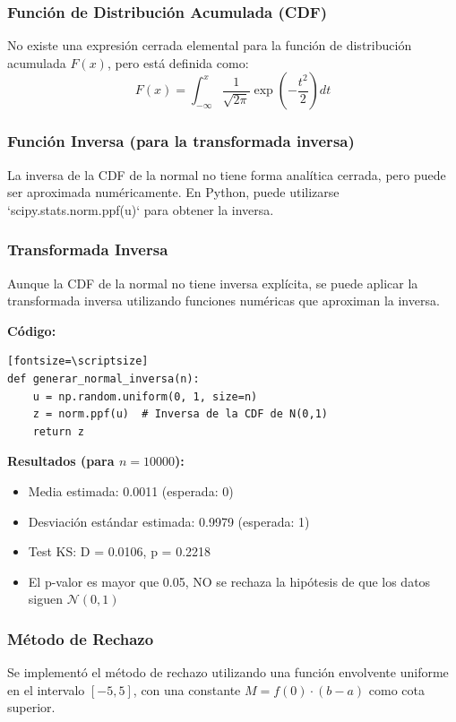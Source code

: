 \documentclass{article}
\begin{document}
\subsubsection*{Función de Distribución Acumulada (CDF)}
No existe una expresión cerrada elemental para la función de distribución acumulada \(F(x)\), pero está definida como:
\[
F(x) = \int_{-\infty}^{x} \frac{1}{\sqrt{2\pi}} \exp\left(-\frac{t^2}{2}\right) dt
\]

\subsubsection*{Función Inversa (para la transformada inversa)}
La inversa de la CDF de la normal no tiene forma analítica cerrada, pero puede ser aproximada numéricamente. En Python, puede utilizarse `scipy.stats.norm.ppf(u)` para obtener la inversa.

\subsubsection{Transformada Inversa}
Aunque la CDF de la normal no tiene inversa explícita, se puede aplicar la transformada inversa utilizando funciones numéricas que aproximan la inversa.

\textbf{Código:}
\begin{verbatim}[fontsize=\scriptsize]
def generar_normal_inversa(n):
    u = np.random.uniform(0, 1, size=n)
    z = norm.ppf(u)  # Inversa de la CDF de N(0,1)
    return z
\end{verbatim}

\textbf{Resultados (para $n=10000$):}
\begin{itemize}
    \item Media estimada: 0.0011 (esperada: 0)
    \item Desviación estándar estimada: 0.9979 (esperada: 1)
    \item Test KS: D = 0.0106, p = 0.2218
    \item El p-valor es mayor que 0.05, NO se rechaza la hipótesis de que los datos siguen $\mathcal{N}(0,1)$
\end{itemize}

\vspace{0.5em}
\subsubsection{Método de Rechazo}
Se implementó el método de rechazo utilizando una función envolvente uniforme en el intervalo $[-5, 5]$, con una constante $M = f(0) \cdot (b-a)$ como cota superior.
\end{document}
